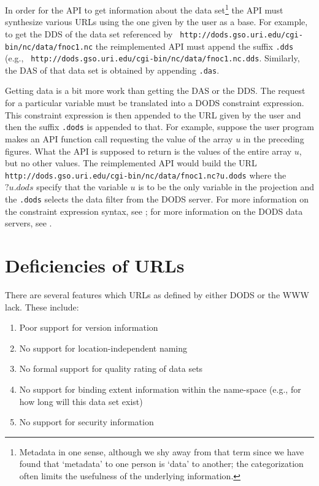 In order for the API to get information about the data set\footnote{Metadata
in one sense, although we shy away from that term since we have found that
`metadata' to one person is `data' to another; the categorization often
limits the usefulness of the underlying information.} the API must synthesize
various URLs using the one given by the user as a base. For example, to get
the DDS of the data set referenced by {\tt
http://dods.gso.uri.edu/cgi-bin/nc/data/fnoc1.nc} the reimplemented API must
append the suffix {\tt .dds} (e.g., {\tt
http://dods.gso.uri.edu/cgi-bin/nc/data/fnoc1.nc.dds}. Similarly, the DAS of
that data set is obtained by appending {\tt .das}. 

Getting data is a bit more work than getting the DAS or the DDS\@. The request
for a particular variable must be translated into a DODS constraint
expression. This constraint expression is then appended to the URL given by
the user and then the suffix {\tt .dods} is appended to that. For example,
suppose the user program makes an API function call requesting the value of
the array $u$ in the preceding figures. What the API is supposed to return is
the values of the entire array $u$, but no other values. The reimplemented
API would build the URL {\tt
http://dods.gso.uri.edu/cgi-bin/nc/data/fnoc1.nc?u.dods} where the $?u.dods$
specify that the variable $u$ is to be the only variable in the projection
and the {\tt .dods} selects the data filter from the DODS server. For more
information on the constraint expression syntax, see \DAP; for more
information on the DODS data servers, see \DDD\@.

\section{Deficiencies of URLs}
\label{url:deficiencies}

There are several features which URLs as defined by either DODS or the WWW
lack. These include:

\begin{enumerate}

\item Poor support for version information

\item No support for location-independent naming

\item No formal support for quality rating of data sets

\item No support for binding extent information within the name-space (e.g.,
  for how long will this data set exist)

\item No support for security information

\end{enumerate}

